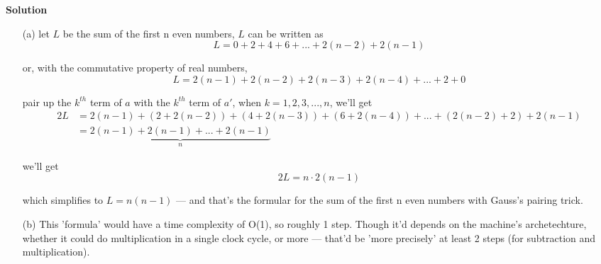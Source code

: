 \documentclass{article}
\newcommand{\solution}{\textbf{\large Solution}}
\theoremstyle{remark}
\begin{document}
  \medskip
  \solution

  \begin{enumerate}
      \item[(a)] let $L$ be the sum of the first n even numbers, $L$ can be written as
        \begin{equation}\tag{a}\label{eq:L-def}
          L = 0 + 2 + 4 + 6 + ... + 2(n-2) + 2(n-1)
        \end{equation}

          or, with the commutative property of real numbers,
        \begin{equation}\tag{a'}
            L = 2(n-1) + 2(n-2) + 2(n-3) + 2(n-4) + ... + 2 + 0
        \end{equation}

          pair up the $k^{th}$ term of $a$ with the $k^{th}$ term of $a'$, when $k = 1, 2, 3, ..., n$, we'll get
        \[
          \begin{aligned}
          2L &= 2(n-1) + (2 + 2(n-2)) + (4 + 2(n-3)) + (6 + 2(n-4)) + ... + (2(n-2) + 2) + 2(n-1) \\
             &= \underbrace{2(n-1) + 2(n-1) + ... + 2(n-1)}_{n}
          \end{aligned}
        \]

        we'll get 
          \[2L = n \cdot 2(n-1)\]

          which simplifies to $\boxed{L = n(n-1)}$ --- and that's the formular for the sum of the first n even numbers with Gauss's pairing trick. 

      \item[(b)] This 'formula' would have a time complexity of O(1), so roughly 1 step. Though it'd depends on the machine's archetechture, whether it could do multiplication in a single clock cycle, or more --- that'd be 'more precisely' at least 2 steps (for subtraction and multiplication).

  \end{enumerate}

  
\end{document}
